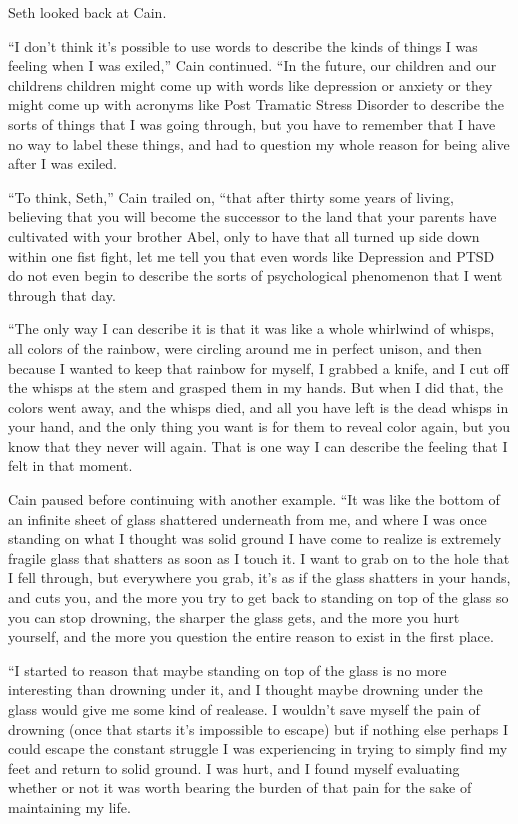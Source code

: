\documentclass[12pt,twoside,titlepage]{report}
\begin{document}
Seth looked back at Cain.

``I don't think it's possible to use words to describe the kinds of
things I was feeling when I was exiled,'' Cain continued. ``In the
future, our children and our childrens children might come up with words
like depression or anxiety or they might come up with acronyms like Post
Tramatic Stress Disorder to describe the sorts of things that I was
going through, but you have to remember that I have no way to label
these things, and had to question my whole reason for being alive after
I was exiled.

``To think, Seth,'' Cain trailed on, ``that after thirty some years of
living, believing that you will become the successor to the land that
your parents have cultivated with your brother Abel, only to have that
all turned up side down within one fist fight, let me tell you that even
words like Depression and PTSD do not even begin to describe the sorts
of psychological phenomenon that I went through that day.

``The only way I can describe it is that it was like a whole whirlwind
of whisps, all colors of the rainbow, were circling around me in perfect
unison, and then because I wanted to keep that rainbow for myself, I
grabbed a knife, and I cut off the whisps at the stem and grasped them
in my hands. But when I did that, the colors went away, and the whisps
died, and all you have left is the dead whisps in your hand, and the
only thing you want is for them to reveal color again, but you know that
they never will again. That is one way I can describe the feeling that I
felt in that moment.

Cain paused before continuing with another example. ``It was like the
bottom of an infinite sheet of glass shattered underneath from me, and
where I was once standing on what I thought was solid ground I have come
to realize is extremely fragile glass that shatters as soon as I touch
it. I want to grab on to the hole that I fell through, but everywhere
you grab, it's as if the glass shatters in your hands, and cuts you, and
the more you try to get back to standing on top of the glass so you can
stop drowning, the sharper the glass gets, and the more you hurt
yourself, and the more you question the entire reason to exist in the
first place.

``I started to reason that maybe standing on top of the glass is no more
interesting than drowning under it, and I thought maybe drowning under
the glass would give me some kind of realease. I wouldn't save myself
the pain of drowning (once that starts it's impossible to escape) but if
nothing else perhaps I could escape the constant struggle I was
experiencing in trying to simply find my feet and return to solid
ground. I was hurt, and I found myself evaluating whether or not it was
worth bearing the burden of that pain for the sake of maintaining my
life.
\end{document}
